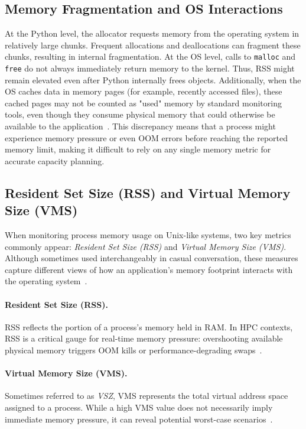 \subsection{Memory Fragmentation and \ac{OS} Interactions}
\label{subsec:fundamentals-fragmentation}

At the Python level, the allocator requests memory from the operating system in relatively large chunks.
Frequent allocations and deallocations can fragment these chunks, resulting in internal fragmentation.
At the \ac{OS} level, calls to \texttt{malloc} and \texttt{free} do not always immediately return memory to the kernel.
Thus, \ac{RSS} might remain elevated even after Python internally frees objects.
Additionally, when the \ac{OS} caches data in memory pages (for example, recently accessed files), these cached pages may not be counted as "used" memory by standard monitoring tools, even though they consume physical memory that could otherwise be available to the application~\cite{Nanjekye2023}.
This discrepancy means that a process might experience memory pressure or even \ac{OOM} errors before reaching the reported memory limit, making it difficult to rely on any single memory metric for accurate capacity planning.

\subsection{Resident Set Size (RSS) and Virtual Memory Size (VMS)}
\label{subsec:fundamentals-rss-vms}

When monitoring process memory usage on Unix-like systems, two key metrics commonly appear:
\emph{Resident Set Size (RSS)} and \emph{Virtual Memory Size (VMS)}.
Although sometimes used interchangeably in casual conversation, these measures capture different views of how an application's memory footprint interacts with the operating system~\cite{linux-man-proc}.

\paragraph{Resident Set Size (RSS).}
\ac{RSS} reflects the portion of a process's memory held in \ac{RAM}.
In \ac{HPC} contexts, \ac{RSS} is a critical gauge for real-time memory pressure:
overshooting available physical memory triggers \ac{OOM} kills or performance-degrading swaps~\cite{Bader2023}.

\paragraph{Virtual Memory Size (VMS).}
Sometimes referred to as \textit{VSZ}, \ac{VMS} represents the total virtual address space assigned to a process.
While a high \ac{VMS} value does not necessarily imply immediate memory pressure, it can reveal potential worst-case scenarios~\cite{linux-man-proc}.

